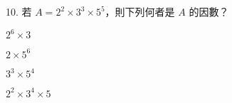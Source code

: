 \documentclass[12pt]{article}
\begin{document}
\begin{problem}[widest=10]
  \item[10.] 若 $A = 2^2 \times 3^3 \times 5^5$，則下列何者是 $A$ 的因數？
  \begin{choices}
    \item $2^6 \times 3$
    \item $2 \times 5^6$
    \item $3^3 \times 5^4$
    \item $2^2 \times 3^4 \times 5$
  \end{choices}
\end{problem}
\end{document}
